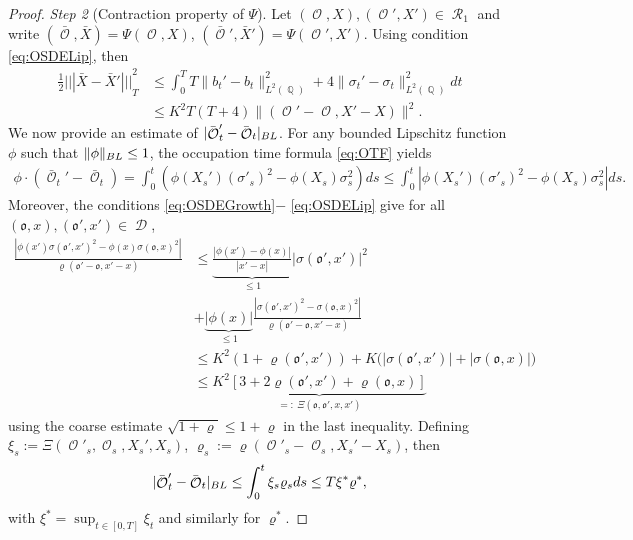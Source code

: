 \documentclass[11pt]{article}
\newcommand{\vertiii}[1]{{| \! | \! | #1 | \!
    | \! |}}
\def\mo{\mathfrak{o}}
\theoremstyle{plain}
\theoremstyle{definition}
\DeclareMathOperator{\Q}{\mathbb{Q}}
\DeclareMathOperator{\calD}{\mathcal{D}}
\DeclareMathOperator{\calO}{\mathcal{O}}
\DeclareMathOperator{\calR}{\mathcal{R}}
\begin{document}
\begin{proof}
\noindent
\textit{Step 2} (Contraction property of $\Psi$). Let   $(\calO,X),(\calO',X')\in \calR_1$ and write $(\bar{\calO}, \bar{X}) = \Psi(\calO,X)$, $(\bar{\calO}', \bar{X}') = \Psi(\calO',X')$. Using   condition \eqref{eq:OSDELip}, then 
\begin{align*}
    \frac{1}{2}\vertiii{\bar{X}-\bar{X}'}_T^2 
      &\le   \int_0^T T\lVert b_t' - b_t\rVert_{L^2(\Q)}^2  + 4 \lVert \sigma_t' - \sigma_t\rVert_{L^2(\Q)}^2 dt \\ 
      &\le K^2T(T+4)\lVert(\calO'-\calO,X'-X)\rVert^2.  
\end{align*}
We now provide an estimate of $|\bar{\calO}_t' -\bar{\calO}_t|_{\textnormal{\tiny{BL}}} $. 
For any bounded Lipschitz function $\phi$ such that $\lVert \phi\rVert_{\textnormal{\tiny{BL}}}\le 1$,  the occupation time formula \eqref{eq:OTF} yields  
\begin{align*}\label{eq:phiOSDE}
   \phi\cdot (\bar{\calO}_t'-\bar{\calO}_t) 
   =  
   \int_0^t (\phi(X_s') (\sigma'_s)^2 -   \phi(X_s) \sigma_s^2) ds 
    \le  \int_0^t\left| \phi(X_s') (\sigma'_s)^2 - \phi(X_s) \sigma_s^2 \right|ds.
\end{align*} 
Moreover, 
 the  conditions  \eqref{eq:OSDEGrowth}$-$ \eqref{eq:OSDELip} give for all  $ (\mo,x),(\mo',x') \in \calD$,
\begin{align*}
   \frac{| \phi(x') \sigma(\mo',x')^2 - \phi(x) \sigma(\mo,x)^2 |}{\varrho(\mo'-\mo,x'-x)} &\le  \underbrace{\frac{|\phi(x')-\phi(x)|}{|x'-x|}}_{\le 1} |\sigma(\mo',x')|^2 \\
   &+ \underbrace{| \phi(x)|}_{\le 1} \frac{|\sigma(\mo',x')^2 -  \sigma(\mo,x)^2|}{\varrho(\mo'-\mo,x'-x)} \\[1em] 
   &\le K^2(1 + \varrho(\mo',x'))+ K \big( |\sigma(\mo',x')| + |\sigma(\mo,x)|\big)\\[1em] 
     &\le \underbrace{K^2\left[ 3 +  2 \varrho(\mo',x') +  \varrho(\mo,x)\right]}_{=: \ \Xi(\mo,\mo',x,x')}
\end{align*}
using the  coarse estimate 
$ \sqrt{ 1+\varrho} \le 1+\varrho$
in the last inequality. 
Defining $ \xi_s := \Xi(\calO'_s,\calO_s,X_s',X_s)$, $\varrho_s := \varrho(\calO'_s-\calO_s,X_s'-X_s)$, then %
$$| \bar{\calO}_t'-\bar{\calO}_t |_{\textnormal{\tiny{BL}}} %
   \le   
 \int_0^t\xi_s \varrho_s ds \le T \xi^* \varrho^*, $$ 
 with  $\xi^* = \sup_{t\in [0,T]}\xi_t$ and similarly for $\varrho^*$. 

\end{proof}
\end{document}
